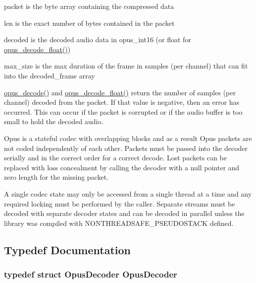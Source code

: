 \begin{DoxyItemize}
\item packet is the byte array containing the compressed data \item len is the exact number of bytes contained in the packet \item decoded is the decoded audio data in opus\_\-int16 (or float for \hyperlink{group__opus__decoder_ga9c554b8c0214e24733a299fe53bb3bd2}{opus\_\-decode\_\-float()}) \item max\_\-size is the max duration of the frame in samples (per channel) that can fit into the decoded\_\-frame array\end{DoxyItemize}
\hyperlink{group__opus__decoder_ga7d1111f64c36027ddcb81799df9b3fc9}{opus\_\-decode()} and \hyperlink{group__opus__decoder_ga9c554b8c0214e24733a299fe53bb3bd2}{opus\_\-decode\_\-float()} return the number of samples (per channel) decoded from the packet. If that value is negative, then an error has occurred. This can occur if the packet is corrupted or if the audio buffer is too small to hold the decoded audio.

Opus is a stateful codec with overlapping blocks and as a result Opus packets are not coded independently of each other. Packets must be passed into the decoder serially and in the correct order for a correct decode. Lost packets can be replaced with loss concealment by calling the decoder with a null pointer and zero length for the missing packet.

A single codec state may only be accessed from a single thread at a time and any required locking must be performed by the caller. Separate streams must be decoded with separate decoder states and can be decoded in parallel unless the library was compiled with NONTHREADSAFE\_\-PSEUDOSTACK defined. 

\subsection{Typedef Documentation}
\hypertarget{group__opus__decoder_ga401d8579958d36094715a6b90cd159a6}{
\subsubsection[{OpusDecoder}]{\setlength{\rightskip}{0pt plus 5cm}typedef struct {\bf OpusDecoder} {\bf OpusDecoder}}}
\label{group__opus__decoder_ga401d8579958d36094715a6b90cd159a6}



